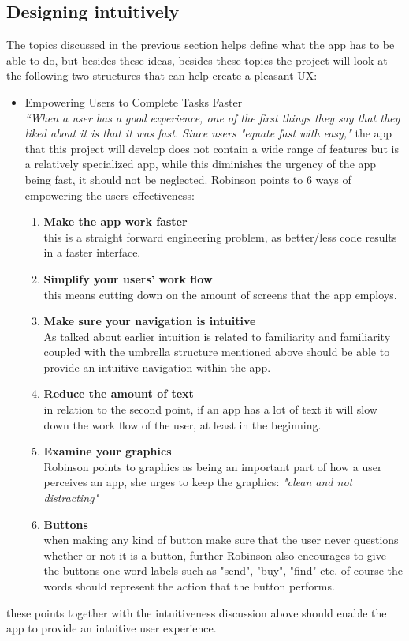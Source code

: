 \subsection{ Designing intuitively  }
The topics discussed in the previous section helps define what the app has to be 
able to do, but besides these ideas, besides these topics the project will look 
at the following two structures that can help create a pleasant UX:
\begin{itemize}
\item  Empowering Users to Complete Tasks Faster\\
 \textit{“When a user has a good experience, one of the first things they say 
 that they liked about it is that it was fast. Since users "equate fast with 
 easy," }\cite{UXKeys} the app that this project will develop does not contain a 
 wide range of features but is a relatively specialized app, while this 
 diminishes the urgency of the app being fast, it should not be neglected. \label{EvalConFast}
 Robinson points to 6 ways of empowering the users effectiveness\cite{UXKeys}:
 \begin{enumerate}
 \item \textbf{Make the app work faster}\\
 this is a straight forward engineering problem, as better/less code results in a 
 faster interface. 
 \item \textbf{Simplify your users’ work flow}\\
  this means cutting down on the amount of screens that the app employs.
 \item \textbf{Make sure your navigation is intuitive}\\\label{effectivenessP3}
 As talked about earlier intuition is related to familiarity and familiarity 
 coupled with the umbrella structure mentioned above should be able to provide an 
 intuitive navigation within the app.
 \item \textbf{Reduce the amount of text}\\
 in relation to the second point, if an app has a lot of text it will slow down 
 the work flow of the user, at least in the beginning.
 \item \textbf{Examine your graphics}\\
 Robinson points to graphics as being an important part of how a user perceives 
 an app, she urges to keep the graphics: \textit{"clean and not distracting"} 
 \item \textbf{Buttons}\\
 when making any kind of button make sure that the user never questions whether 
 or not it is a button, further Robinson also encourages to give the buttons one 
 word labels such as "send", "buy", "find" etc. of course the words should 
 represent the action that the button performs.
 \end{enumerate} 
\end{itemize} 
these points together with the intuitiveness discussion above should enable the 
app to provide an intuitive user experience. 

